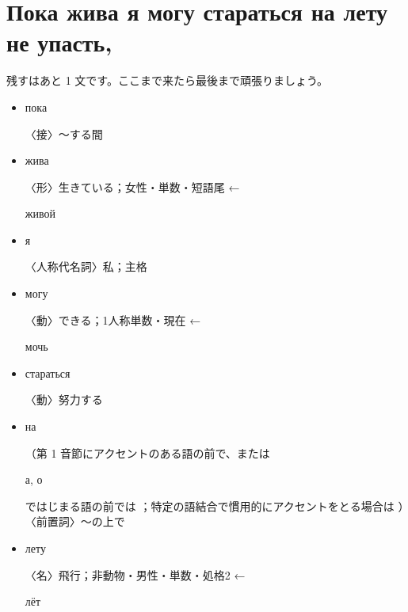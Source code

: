 \documentclass[12pt]{ltjsarticle}
\begin{document}
\section{Пока жива я могу стараться на лету не упасть,}
残すはあと 1 文です。ここまで来たら最後まで頑張りましょう。
\begin{itemize}
    \item \begin{russian}пока\end{russian}  〈接〉〜する間
    \item \begin{russian}жива\end{russian}  〈形〉生きている；女性・単数・短語尾 ← \begin{russian}живой\end{russian} 
    \item \begin{russian}я\end{russian}  〈人称代名詞〉私；主格
    \item \begin{russian}могу\end{russian}   〈動〉できる；1人称単数・現在 ← \begin{russian}мочь\end{russian} 
    \item \begin{russian}стараться\end{russian}  〈動〉努力する
    \item \begin{russian}на\end{russian}  （第 1 音節にアクセントのある語の前で、または \begin{russian}а, о\end{russian} ではじまる語の前では ；特定の語結合で慣用的にアクセントをとる場合は ）〈前置詞〉〜の上で
    \item \begin{russian}лету\end{russian}  〈名〉飛行；非動物・男性・単数・処格2 ← \begin{russian}лёт\end{russian} 

\end{itemize}
\end{document}
